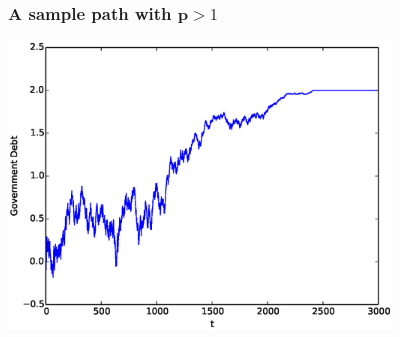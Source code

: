 \documentclass{beamer}
\begin{document}
 \begin{frame}

	\frametitle{A sample path with  $\bm{p} > 1$}
	\begin{center}
	\includegraphics[width=4in]{Images/port1.eps}
	\end{center}
\end{frame}
\end{document}
